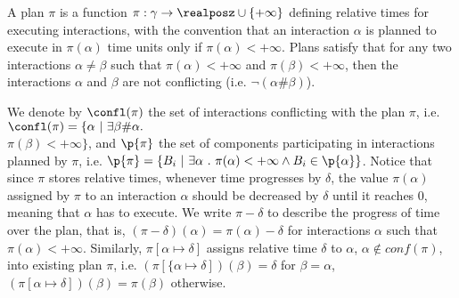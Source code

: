 \begin{definition}[Plan]\label{def:plan}
A plan $\pi$ is a function $\pi:\gamma \to\realposz \cup \{ +\infty \}$ defining relative times for 
executing interactions, with the convention that an interaction $\alpha$ is planned to execute in $\pi(\alpha)$ time units only if $\pi(\alpha) < +\infty$.
Plans satisfy that for any two interactions $\alpha \neq \beta$ such that $\pi(\alpha) < +\infty$ and $\pi(\beta) < +\infty$, then the interactions $\alpha$ and $\beta$ are not conflicting (i.e. $\neg(\alpha\#\beta)$).
\end{definition}
We denote by $\confl(\pi)$ the set of interactions conflicting with the plan $\pi$, i.e. $\confl(\pi) = \{ \alpha \ | \ \exists \beta \# \alpha.$ \\$ \pi (\beta) < +\infty \}$, and $\p{\pi}$ the set of components participating in interactions planned by $\pi$, i.e. $\p{\pi} = \{ B_i \ | \ \exists \alpha \ . \ \pi(\alpha) < +\infty \wedge B_i \in \p{\alpha} \}$.
Notice that since $\pi$ stores relative times, whenever time progresses by $\delta$, the value $\pi(\alpha)$ assigned by $\pi$ to an interaction $\alpha$ should be decreased by $\delta$ 
until it reaches $0$, meaning that $\alpha$ has to execute.
We write $\pi-\delta$ to describe the progress of time 
over the plan, that is, $(\pi-\delta)(\alpha) = \pi(\alpha) - \delta$ for interactions $\alpha$ such that $\pi(\alpha) < +\infty$.
Similarly, $\pi [ \alpha \mapsto \delta ]$ assigns relative time $\delta$ to $\alpha$, $\alpha \notin conf(\pi)$, into existing plan $\pi$, i.e. $(\pi [ \{ \alpha \mapsto \delta ])(\beta) = \delta$ for $\beta = \alpha$, $(\pi [ \alpha \mapsto \delta ])(\beta) = \pi(\beta)$ otherwise.

